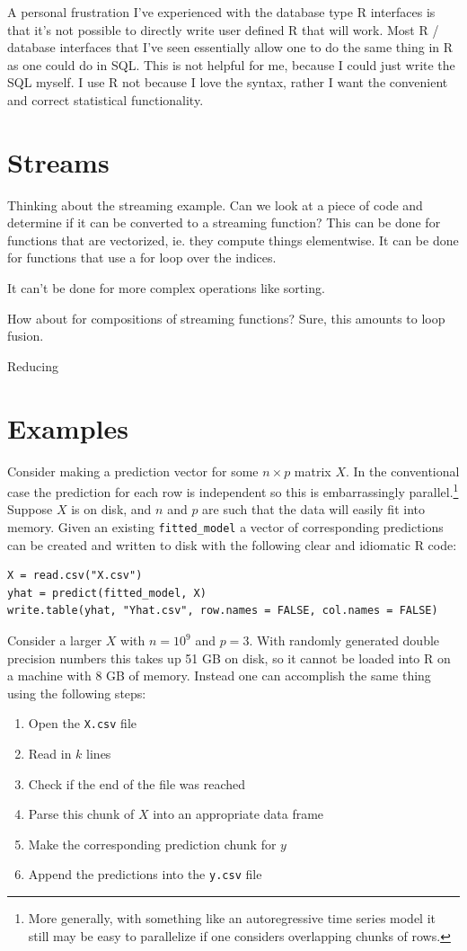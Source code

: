 \documentclass[12pt]{article}
\begin{document}
A personal frustration I've experienced with the database type R interfaces
is that it's not possible to directly write user defined R that will work.
Most R / database interfaces that I've seen essentially allow one to do the
same thing in R as one could do in SQL. This is not helpful for me, because
I could just write the SQL myself. I use R not because I love the syntax,
rather I want the convenient and correct statistical functionality.

\section{Streams}

Thinking about the streaming example. Can we look at a
piece of code and determine if it can be converted to a streaming function?
This can be done for functions that are vectorized, ie. they compute things
elementwise. It can be done for functions that use a for loop over the
indices. 

It can't be done for more complex operations like sorting.

How about for compositions of streaming functions? Sure, this amounts to
loop fusion.

Reducing

\section{Examples}

Consider making a prediction vector for some $n \times p$ matrix $X$. In
the conventional case the prediction for each row is independent so this is
embarrassingly parallel.\footnote{More generally, with something like an
autoregressive time series model it still may be easy to parallelize if one
considers overlapping chunks of rows.} Suppose $X$ is on disk, and $n$ and
$p$ are such that the data will easily fit into memory.  Given an existing
\texttt{fitted\_model} a vector of corresponding predictions can be created
and written to disk with the following clear and idiomatic R code:

\begin{verbatim}
X = read.csv("X.csv")
yhat = predict(fitted_model, X)
write.table(yhat, "Yhat.csv", row.names = FALSE, col.names = FALSE)
\end{verbatim}

Consider a larger $X$ with $n = 10^{9}$ and $p = 3$. With randomly generated double
precision numbers this takes up 51 GB on disk, so it cannot be loaded into
R on a machine with 8 GB of memory. Instead one can accomplish the same
thing using the following steps:
\begin{enumerate}
    \item Open the \texttt{X.csv} file
    \item Read in $k$ lines
    \item Check if the end of the file was reached
    \item Parse this chunk of $X$ into an appropriate data frame
    \item Make the corresponding prediction chunk for $y$
    \item Append the predictions into the \texttt{y.csv} file
\end{enumerate}
\end{document}
